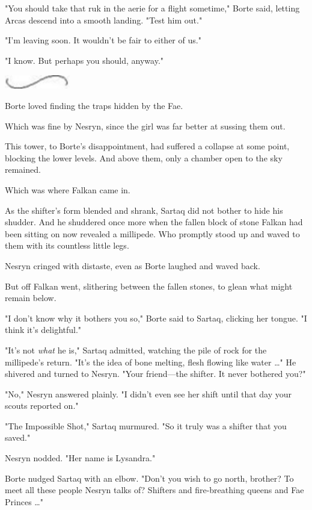 "You should take that ruk in the aerie for a flight sometime," Borte said, letting Arcas descend into a smooth landing. "Test him out."

"I'm leaving soon. It wouldn't be fair to either of us."

"I know. But perhaps you should, anyway."

\includegraphics[width=1.12in,height=0.24in]{images/seperator}

Borte loved finding the traps hidden by the Fae.

Which was fine by Nesryn, since the girl was far better at sussing them out.

This tower, to Borte's disappointment, had suffered a collapse at some point, blocking the lower levels. And above them, only a chamber open to the sky remained.

Which was where Falkan came in.

As the shifter's form blended and shrank, Sartaq did not bother to hide his shudder. And he shuddered once more when the fallen block of stone Falkan had been sitting on now revealed a millipede. Who promptly stood up and waved to them with its countless little legs.

Nesryn cringed with distaste, even as Borte laughed and waved back.

But off Falkan went, slithering between the fallen stones, to glean what might remain below.

"I don't know why it bothers you so," Borte said to Sartaq, clicking her tongue. "I think it's delightful."

"It's not \emph{what} he is," Sartaq admitted, watching the pile of rock for the millipede's return. "It's the idea of bone melting, flesh flowing like water \ldots" He shivered and turned to Nesryn. "Your friend---the shifter. It never bothered you?"

"No," Nesryn answered plainly. "I didn't even see her shift until that day your scouts reported on."

"The Impossible Shot," Sartaq murmured. "So it truly was a shifter that you saved."

Nesryn nodded. "Her name is Lysandra."

Borte nudged Sartaq with an elbow. "Don't you wish to go north, brother? To meet all these people Nesryn talks of? Shifters and fire-breathing queens and Fae Princes \ldots"

